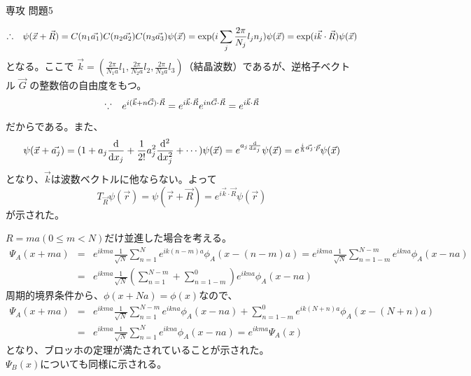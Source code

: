 \documentclass[fleqn]{jbook}
\begin{document}
\begin{answer}{専攻 問題5}{}
\begin{subanswers}
 \[ \Yueni \psi(\vec{x}+\vec{R})=C(n_1\vec{a_1})C(n_2\vec{a_2})C(n_3\vec{a_3})
                               \psi(\vec{x})
           =\exp(i\sum_{j} \frac{2\pi}{N_j}l_j n_j )\psi(\vec{x}) 
           =\exp(i\vec{k}\cdot \vec{R}) \psi(\vec{x}) \]
  となる。ここで $\vec{k}=(\frac{2\pi}{N_1 a}l_1,\frac{2\pi}{N_2 a}l_2,\frac{2\pi}{N_3 a}l_3)$（結晶波数）であるが、逆格子ベクトル
  $\vec{G}$ の整数倍の自由度をもつ。
  \[\Naze   e^{i(\vec{k}+n\vec{G})\cdot\vec{R}}%
    = e^{i\vec{k}\cdot\vec{R}}e^{in\vec{G}\cdot\vec{R}}%
    = e^{i\vec{k}\cdot\vec{R}} \]
%
  だからである。また、
\[ \psi(\vec{x}+\vec{a_j})=(1+a_j{\frac{{\rm d} }{{\rm d} x_j}}+\frac{1}{2!}a_j^2 {\frac{{\rm d} ^2}{{\rm d} x_j^2}}+\cdots )\psi(\vec{x})=e^{a_j {\frac{{\rm d} }{{\rm d} x_j}}}\psi(\vec{x})=e^{\frac{i}{\hbar}\vec{a_j}\cdot \vec{p}}\psi(\vec{x}) \]
となり、$\vec{k}$は波数ベクトルに他ならない。よって
%
  \[ T_{\vec{R}} \psi(\vec{r}) = \psi(\vec{r}+\vec{R})%
                               = e^{i\vec{k}\cdot\vec{R}}\psi(\vec{r}) \]
%
  が示された。


\SubAnswer
  \begin{subsubanswers}
  \SubSubAnswer
%
%
    $R=ma(0\leq m<N)$だけ並進した場合を考える。
%
\begin{eqnarray*}
     \Psi_A(x+ma)%
   &= & e^{ikma}\frac{1}{\sqrt{N}}\sum_{n=1}^{N}e^{ik(n-m)a}\phi_A(x-(n-m)a)%
      =e^{ikma}\frac{1}{\sqrt{N}}\sum_{n=1-m}^{N-m}e^{ikna}\phi_A(x-na)\\
   &= & e^{ikma}\frac{1}{\sqrt{N}}(\sum_{n=1}^{N-m}+\sum_{n=1-m}^0) e^{ikna}\phi_A(x-na)  
\end{eqnarray*}
%
%
   周期的境界条件から、$\phi(x+Na)=\phi(x)$なので、
\begin{eqnarray*}
 \Psi_A(x+ma)%
    &=& e^{ikma}\frac{1}{\sqrt{N}}\sum_{n=1}^{N-m}e^{ikna}\phi_A(x-na)
          +\sum_{n=1-m}^0 e^{ik(N+n)a}\phi_A(x-(N+n)a) \\
    &=& e^{ikma}\frac{1}{\sqrt{N}}\sum_{n=1}^N e^{ikna}\phi_A(x-na) 
     =e^{ikma} \Psi_A(x)   
\end{eqnarray*} 
%
    となり、ブロッホの定理が満たされていることが示された。\\
%
    $\Psi_B(x)$についても同様に示される。



\end{subsubanswers}
\end{subanswers}
\end{answer}
\end{document}
